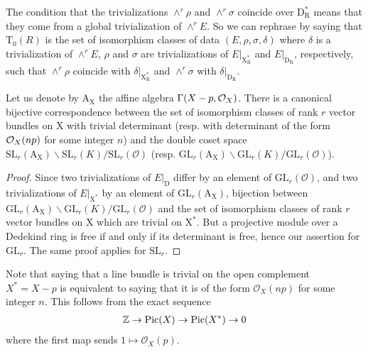 \documentclass[12pt]{article}
\begin{document}
\begin{remark}
    The condition that the trivializations $\wedge^r \rho$ and $\wedge^r \sigma$ coincide over $\textrm{D}^*_{\textrm{R}}$ means that they come from a global trivialization of $\wedge^r E$. So we can rephrase by saying that $\textrm{T}_0(R)$ is the set of isomorphism classes of data $(E, \rho, \sigma, \delta)$ where $\delta$ is a trivialization of $\wedge^r E$, $\rho$ and $\sigma$ are trivializations of $E|_{\textrm{X}^*_{\textrm{R}}}$ and $E|_{\textrm{D}_{\textrm{R}}}$, respectively, such that $\wedge^r \rho$ coincide with $\delta|_{\textrm{X}^*_{\textrm{R}}}$ and $\wedge^r \sigma$ with $\delta|_{\textrm{D}_{\textrm{R}}}$.
\end{remark}

\begin{corollary}
    Let us denote by $\textrm{A}_{\textrm{X}}$ the affine algebra $\Gamma(X - p, {\mathcal{O}}_X)$. There is a canonical bijective correspondence between the set of isomorphism classes of rank $r$ vector bundles on $\textrm{X}$ with trivial determinant (resp. with determinant of the form ${\mathcal{O}}_X(np)$ for some integer $n$) and the double coset space $\textrm{SL}_r(\textrm{A}_{\textrm{X}})\backslash \textrm{SL}_r(K)/\textrm{SL}_r(\mathcal{O})$ (resp. $\textrm{GL}_r(\textrm{A}_{\textrm{X}})\backslash \textrm{GL}_r(K)/\textrm{GL}_r(\mathcal{O})$).
\end{corollary}
\begin{proof}
    Since two trivializations of $E|_{\textrm{D}}$ differ by an element of $\textrm{GL}_r(\mathcal{O})$, and two trivializations of $E|_{\textrm{X}^*}$ by an element of $\textrm{GL}_r(\textrm{A}_{\textrm{X}})$,  bijection between $\textrm{GL}_r(\textrm{A}_{\textrm{X}})\backslash\textrm{GL}_r(K)/\textrm{GL}_r(\mathcal{O})$ and the set of isomorphism classes of rank $r$ vector bundles on $\textrm{X}$ which are trivial on $\textrm{X}^*$. But a projective module over a Dedekind ring is free if and only if its determinant is free, hence our assertion for $\textrm{GL}_r$. The same proof applies for $\textrm{SL}_r$.
\end{proof}
\begin{remark}
    Note that saying that a line bundle is trivial on the open complement $X^* = X - p$ is equivalent to saying that it is of the form $\mathcal{O}_{X}(np)$ for some integer $n$. This follows from the exact sequence \begin{align*}
        \mathbb{Z} \to \operatorname{Pic}(X) \to \operatorname{Pic}(X^*) \to 0
    \end{align*} where the first map sends $1 \mapsto \mathcal{O}_X(p)$.
\end{remark}
\end{document}
